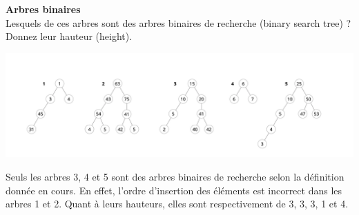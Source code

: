 \begin{Exercice}[10 minutes] \textbf{Arbres binaires} \\
	Lesquels de ces arbres sont des arbres binaires de recherche (binary search tree) ? Donnez leur hauteur (height).
	
	\includegraphics[width=18cm]{resources/exercice5.png}

	\begin{solution}
		Seuls les arbres 3, 4 et 5 sont des arbres binaires de recherche selon la définition donnée en cours. En effet, l'ordre d'insertion des éléments est incorrect dans les arbres 1 et 2. 
		Quant à leurs hauteurs, elles sont respectivement de 3, 3, 3, 1 et 4.
	\end{solution}
\end{Exercice}


